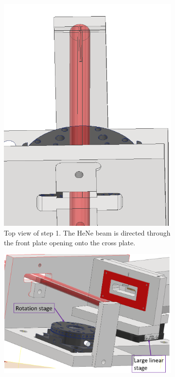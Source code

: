 \begin{figure} [H]
	\centering
	\begin{subfigure}[t]{0.42\textwidth}
		\includegraphics[width=\textwidth]{InventorPics/Alignment1.1.PNG}
		\caption{Top view of step 1. The HeNe beam is directed through 
		the front plate opening onto the cross plate.}
		\label{InvFSSRAlignment11}
	\end{subfigure}%
	\hfill
	\begin{subfigure}[t]{0.56\textwidth}
	\centering
		\includegraphics[width=\textwidth]{InventorPics/Alignment1.2.PNG}

\end{subfigure}
\end{figure}
